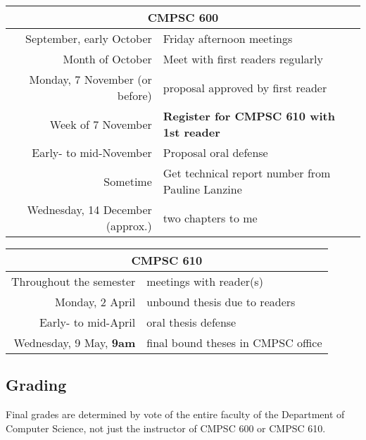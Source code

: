 \begin{center}
\begin{tabular}{rl}
\hline
\multicolumn{2}{c}{\bf CMPSC 600}\\\hline
September, early October & Friday afternoon meetings\\
Month of October & Meet with first readers regularly\\
Monday, 7 November (or before) & proposal approved by first reader\\
Week of 7 November & \bf Register for CMPSC 610 with 1st reader\\
Early- to mid-November & Proposal oral defense\\
Sometime & Get technical report number from Pauline Lanzine\\
Wednesday, 14 December (approx.) & two chapters to me\\
\end{tabular}
\end{center}

\begin{center}
	\begin{tabular}{rl}
\hline
\multicolumn{2}{c}{\bf CMPSC 610}\\\hline
Throughout the semester & meetings with reader(s)\\ 
Monday, 2 April & unbound thesis due to readers\\
Early- to mid-April & oral thesis defense\\
Wednesday, 9 May, \bf 9am & final bound theses in CMPSC office
\end{tabular}
\end{center}

\subsection*{Grading}

Final grades are determined by vote of
the entire faculty of the Department of Computer Science, not just the
instructor of CMPSC 600 or CMPSC 610.

